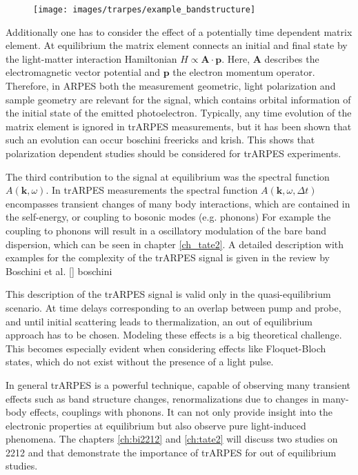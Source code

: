 \begin{figure}
	\centering
	\texttt{[image: images/trarpes/example\_bandstructure]}
	\caption{}
	\label{fig:example_bandstructure}
\end{figure}


Additionally one has to consider the effect of a potentially time dependent matrix element.
At equilibrium the matrix element connects an initial and final state by the light-matter interaction Hamiltonian $H \propto \mathbf{A\cdot\mathbf{p}}$.
Here, $\mathbf{A}$ describes the electromagnetic vector potential and $\mathbf{p}$ the electron momentum operator.
Therefore, in ARPES both the measurement geometric, light polarization and sample geometry are relevant for the signal, which contains orbital information of the initial state of the emitted photoelectron.
Typically, any time evolution of the matrix element is ignored in trARPES measurements, but it has been shown that such an evolution can occur \cite{} boschini freericks and krish.
This shows that polarization dependent studies should be considered for trARPES experiments.

The third contribution to the signal at equilibrium was the spectral function $A(\mathbf{k}, \omega)$.
In trARPES measurements the spectral function $A(\mathbf{k}, \omega, \Delta t)$ encompasses transient changes of many body interactions, which are contained in the self-energy, or coupling to bosonic modes (e.g. phonons)
For example the coupling to phonons will result in a oscillatory modulation of the bare band dispersion, which can be seen in chapter \ref{ch_tate2}.
A detailed description with examples for the complexity of the trARPES signal is given in the review by Boschini et al. \ref{} boschini

This description of the trARPES signal is valid only in the quasi-equilibrium scenario.
At time delays corresponding to an overlap between pump and probe, and until initial scattering leads to thermalization, an out of equilibrium approach has to be chosen.
Modeling these effects is a big theoretical challenge.
This becomes especially evident when considering effects like Floquet-Bloch states, which do not exist without the presence of a light pulse.

In general trARPES is a powerful technique, capable of observing many transient effects such as band structure changes, renormalizations due to changes in many-body effects, couplings with phonons.
It can not only provide insight into the electronic properties at equilibrium but also observe pure light-induced phenomena.
The chapters \ref{ch:bi2212} and \ref{ch:tate2} will discuss two studies on 2212 and  that demonstrate the importance of trARPES for out of equilibrium studies.